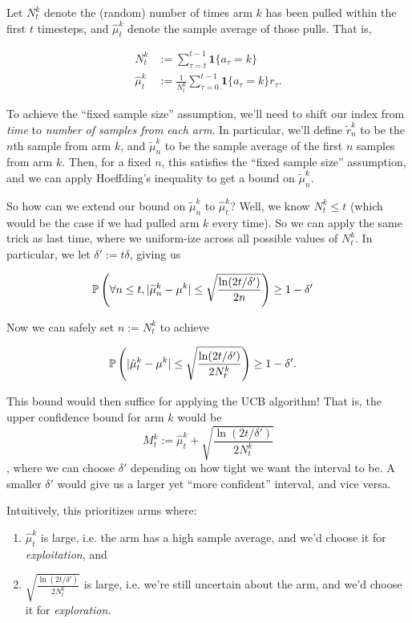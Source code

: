 \documentclass[../main/main]{subfiles}
\begin{document}
Let $N^k_t$ denote the (random) number of times arm $k$ has been pulled within the first $t$ timesteps, and $\hat \mu^k_t$ denote the sample average of those pulls. That is,

\begin{align*}
    N^k_t &:= \sum_{\tau=t}^{t-1} \mathbf{1} \{ a_\tau = k \} \\
    \hat \mu^k_t &:= \frac{1}{N^k_t} \sum_{\tau=0}^{t-1} \mathbf{1} \{ a_\tau = k \} r_\tau.
\end{align*}

To achieve the ``fixed sample size'' assumption, we'll need to shift our index from \emph{time} to \emph{number of samples from each arm}. In particular, we'll define $\tilde r^k_n$ to be the $n$th sample from arm $k$, and $\tilde \mu^k_n$ to be the sample average of the first $n$ samples from arm $k$. Then, for a fixed $n$, this satisfies the ``fixed sample size'' assumption, and we can apply Hoeffding's inequality to get a bound on $\tilde \mu^k_n$.

So how can we extend our bound on $\tilde\mu^k_n$ to $\hat \mu^k_t$? Well, we know $N^k_t \le t$ (which would be the case if we had pulled arm $k$ every time). So we can apply the same trick as last time, where we uniform-ize across all possible values of $N^k_t$. In particular, we let $\delta' := t \delta$, giving us

\begin{align*}
    \P\left( \forall n \le t, |\tilde \mu^k_n - \mu^k | \le \sqrt{\frac{\ln(2t/\delta')}{2n}} \right) &\ge 1-\delta'
\end{align*}

Now we can safely set $n := N^k_t$  to achieve

\begin{align*}
    \P\left( |\hat \mu^k_t - \mu^k | \le \sqrt{\frac{\ln(2t/\delta')}{2N^k_t}} \right) &\ge 1-\delta'.
\end{align*}

This bound would then suffice for applying the UCB algorithm! That is, the upper confidence bound for arm $k$ would be \[ M^k_t := \hat \mu^k_t + \sqrt{\frac{\ln(2t/\delta')}{2N^k_t}} \], where we can choose $\delta'$ depending on how tight we want the interval to be. A smaller $\delta'$ would give us a larger yet ``more confident'' interval, and vice versa.

Intuitively, this prioritizes arms where:

\begin{enumerate}
    \item $\hat \mu^k_t$ is large, i.e. the arm has a high sample average, and we'd choose it for \emph{exploitation}, and
    \item $\sqrt{\frac{\ln(2t/\delta')}{2N^k_t}}$ is large, i.e. we're still uncertain about the arm, and we'd choose it for \emph{exploration}.
\end{enumerate}
\end{document}
